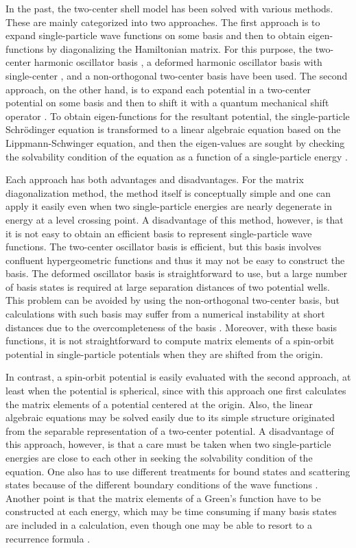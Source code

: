 \documentclass[superscriptaddress,twocolumn,amsmath,amssymb]{revtex4}
\begin{document}
In the past, the two-center shell model has been solved 
with various methods. These are mainly categorized into two approaches. 
The first approach is to expand single-particle wave functions on some basis 
and then to obtain eigen-functions by diagonalizing 
the Hamiltonian matrix. For this purpose, the two-center harmonic oscillator 
basis \cite{HMG69}, a deformed harmonic oscillator basis 
with single-center \cite{IM13,ZM76,PL77}, and a non-orthogonal 
two-center basis \cite{Hasse74,BS74,OS75,NSP87} have been used. 
The second approach, on the other hand, is to expand each potential in a two-center potential 
on some basis and then to shift it with a quantum mechanical 
shift operator \cite{GGR77,MR86}. 
To obtain eigen-functions for the resultant potential, 
the single-particle Schr\"odinger equation is transformed to a linear 
algebraic equation based on the 
Lippmann-Schwinger equation,  
and then the eigen-values are sought by checking 
the solvability condition of the equation as a function of a 
single-particle energy \cite{GGR77,MR86,GKR79,Diaz-Torres05,Diaz-Torres08}. 

Each approach has both advantages and disadvantages. 
For the matrix diagonalization method, the method itself 
is conceptually simple and one can apply it easily even when two 
single-particle energies are nearly degenerate in energy at a level crossing point. 
A disadvantage of this method, however, 
is that it is not easy to obtain 
an efficient basis to represent single-particle wave functions. 
The two-center oscillator basis is efficient, but this 
basis involves confluent hypergeometric functions and thus it may not be 
easy to construct the basis. The deformed oscillator 
basis is straightforward to use, but a large number of basis states is 
required at large separation distances of 
two potential wells. This problem can be avoided by 
using the non-orthogonal two-center basis, but calculations with 
such basis may suffer from a numerical instability at short distances due to 
the overcompleteness of the basis \cite{TRD77}. 
Moreover, with these basis functions, it is not straightforward 
to compute matrix elements 
of a spin-orbit potential in single-particle potentials when they are 
shifted from the origin. 

In contrast, a spin-orbit potential is easily evaluated with the 
second approach, at least when the potential is spherical, 
since with this approach one first calculates the matrix elements of a potential centered at 
the origin. Also, the linear algebraic equations may be solved easily due to its simple structure 
originated from the separable representation of a two-center potential. 
A disadvantage of this approach, however, 
is that a care must be taken when two single-particle 
energies are close to each other in seeking the solvability condition 
of the equation. One also has to use different treatments for bound 
states and scattering states because of the different boundary conditions of 
the wave functions \cite{MR86}. 
Another point is that the matrix elements of a Green's function have to 
be constructed at each energy, which may be time consuming if many basis 
states are included in a calculation, even though one may be able to resort to a 
recurrence formula \cite{MR86,GKR79}. 
\end{document}
